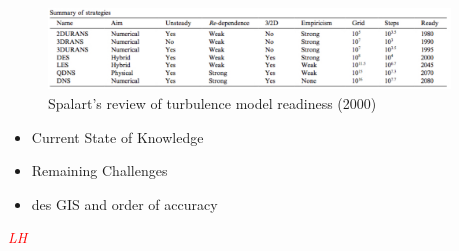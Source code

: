 \documentclass[journal]{new-aiaa}
\begin{document}
\begin{figure}[H]
\begin{center}
\includegraphics[width=0.95\textwidth]{Images/logan/spalart2000strategies_TurbModelTable.pdf}
\caption{ Spalart's review of turbulence model readiness (2000) \cite{spalart2000strategies} }
\label{fig:turbulencemodelreadiness}
\end{center}
\end{figure}




















\begin{itemize}
    \item Current State of Knowledge
    \item Remaining Challenges
    \item des GIS and order of accuracy
\end{itemize}
















\textcolor{red}{\emph{LH}}
\end{document}
